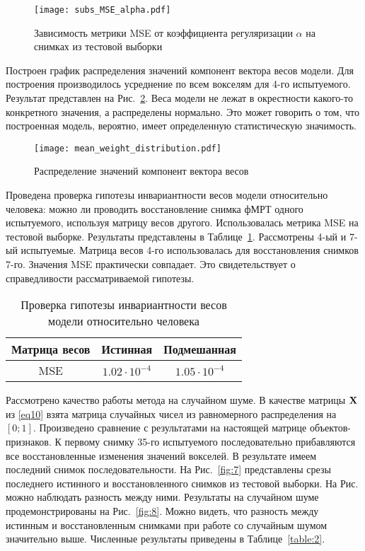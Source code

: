 \documentclass[a4paper, 12pt]{article}
\begin{document}
	\begin{figure}[h!]
		\centering
		\texttt{[image: subs\_MSE\_alpha.pdf]}
		\caption{Зависимость метрики MSE от коэффициента регуляризации $\alpha$ на снимках из тестовой выборки}
		\label{fig:5}
	\end{figure}

	Построен график распределения значений компонент вектора весов модели.
	Для построения производилось усреднение по всем вокселям для 4-го испытуемого.
	Результат представлен на Рис.~\ref{fig:6}.
	Веса модели не лежат в окрестности какого-то конкретного значения, а распределены нормально.
	Это может говорить о том, что построенная модель, вероятно, имеет определенную
	статистическую значимость.

	\begin{figure}[h!]
		\centering
		\texttt{[image: mean\_weight\_distribution.pdf]}
		\caption{Распределение значений компонент вектора весов}
		\label{fig:6}
	\end{figure}

	Проведена проверка гипотезы инвариантности весов модели относительно человека:
	можно ли проводить восстановление снимка фМРТ одного испытуемого, используя
	матрицу весов другого. Использовалась метрика MSE на тестовой выборке.
	Результаты представлены в Таблице~\ref{table:inv}.
	Рассмотрены 4-ый и 7-ый испытуемые. Матрица весов 4-го использовалась для восстановления
	снимков 7-го.
	Значения MSE практически совпадает. Это свидетельствует о справедливости рассматриваемой
	гипотезы.

	\begin{table}[h!]
		\centering
		\caption{Проверка гипотезы инвариантности весов модели относительно человека}
		\begin{tabular}{|c|c|c|}
			\hline
			Матрица весов	&	Истинная	&	Подмешанная \\ \hline \hline
			MSE		& 	$1.02 \cdot 10^{-4}$	 &		$1.05 \cdot 10^{-4}$ \\ \hline
		\end{tabular}
		\label{table:inv}
	\end{table}

	Рассмотрено качество работы метода на случайном шуме. В качестве матрицы $\mathbf{X}$ из \eqref{eq10}
	взята матрица случайных чисел из равномерного распределения на $[0; 1]$. 
	Произведено сравнение с результатами на настоящей матрице объектов-признаков. 
	К первому снимку 35-го испытуемого последовательно прибавляются все восстановленные 
	изменения значений вокселей. 
	В результате имеем последний снимок последовательности. На Рис.~\ref*{fig:7}
	представлены срезы последнего истинного и восстановленного снимков из тестовой выборки. 
	На Рис. можно наблюдать разность между ними.
	Результаты на случайном шуме продемонстрированы на Рис.~\ref*{fig:8}.
	Можно видеть, что разность между истинным и восстановленным снимками при работе со случайным шумом
	значительно выше. Численные результаты приведены в Таблице~\ref{table:2}.
\end{document}
